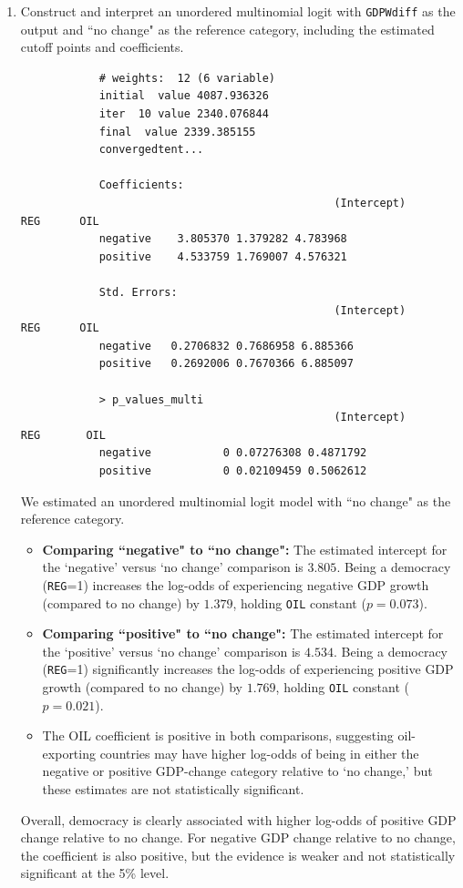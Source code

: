\documentclass[12pt,letterpaper]{article}
\begin{document}
	\begin{enumerate}
		\item Construct and interpret an unordered multinomial logit with \texttt{GDPWdiff} as the output and ``no change" as the reference category, including the estimated cutoff points and coefficients.
		
		
		
		\begin{verbatim}
			# weights:  12 (6 variable)
			initial  value 4087.936326 
			iter  10 value 2340.076844
			final  value 2339.385155 
			convergedtent...
			
			Coefficients:
												(Intercept)      REG      OIL
			negative    3.805370 1.379282 4.783968
			positive    4.533759 1.769007 4.576321
			
			Std. Errors:
												(Intercept)       REG      OIL
			negative   0.2706832 0.7686958 6.885366
			positive   0.2692006 0.7670366 6.885097
			
			> p_values_multi
												(Intercept)        REG       OIL
			negative           0 0.07276308 0.4871792
			positive           0 0.02109459 0.5062612
		\end{verbatim}
		
		\vspace{0.2cm}
		We estimated an unordered multinomial logit model with ``no change" as the reference category.
		\begin{itemize}
			\item \textbf{Comparing ``negative" to ``no change":} The estimated intercept for the ‘negative’ versus ‘no change’ comparison is $3.805$. Being a democracy (\texttt{REG}=1) increases the log-odds of experiencing negative GDP growth (compared to no change) by $1.379$, holding \texttt{OIL} constant ($p = 0.073$).
			\item \textbf{Comparing ``positive" to ``no change":} The estimated intercept for the ‘positive’ versus ‘no change’ comparison is $4.534$. Being a democracy (\texttt{REG}=1) significantly increases the log-odds of experiencing positive GDP growth (compared to no change) by $1.769$, holding \texttt{OIL} constant ($p = 0.021$).
			
			\item The OIL coefficient is positive in both comparisons, suggesting oil-exporting countries may have higher log-odds of being in either the negative or positive GDP-change category relative to ‘no change,’ but these estimates are not statistically significant.
		\end{itemize}
		Overall, democracy is clearly associated with higher log-odds of positive GDP change relative to no change. For negative GDP change relative to no change, the coefficient is also positive, but the evidence is weaker and not statistically significant at the 5\% level.


\end{enumerate}
\end{document}
